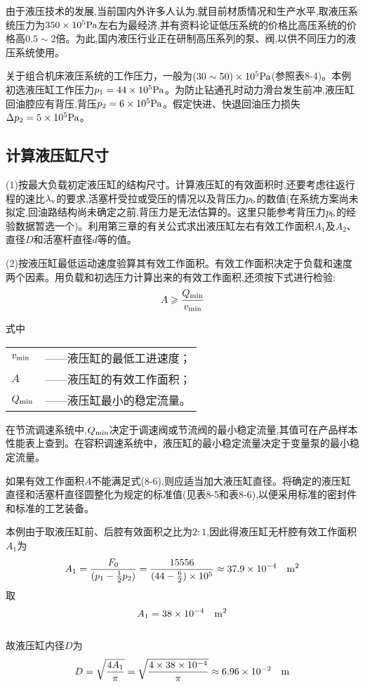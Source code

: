由于液压技术的发展,当前国内外许多人认为,就目前材质情况和生产水平,取液压系统压力为$350\times 10^5{\rm Pa}$左右为最经济,并有资料论证低压系统的价格比高压系统的价格高$0.5\sim 2$倍。为此,国内液压行业正在研制高压系列的泵、阀,以供不同压力的液压系统使用。

关于组合机床液压系统的工作压力，一般为$(30\sim 50)\times 10^5{\rm Pa}$(参照表8-4)。本例初选液压缸工作压力$p_{1}=44\times 10^5{\rm Pa}$。为防止钻通孔时动力滑台发生前冲,液压缸回油腔应有背压,背压$p_{2}=6\times 10^5{\rm Pa}$。假定快进、快退回油压力损失$\Delta p_{2}=5\times 10^5{\rm Pa}$。

\subsection{计算液压缸尺寸}
(1)按最大负载初定液压缸的结构尺寸。计算液压缸的有效面积时,还要考虑往返行程的速比$\lambda_{\rm v}$的要求,活塞杆受拉或受压的情况以及背压力$p_{\rm b}$的数值(在系统方案尚未拟定,回油路结构尚未确定之前,背压力是无法估算的。这里只能参考背压力$p_{\rm b}$的经验数据暂选一个)。利用第三章的有关公式求出液压缸左右有效工作面积$A_{1}$及$A_{2}$、直径$D$和活塞杆直径$d$等的值。

(2)按液压缸最低运动速度验算其有效工作面积。有效工作面积决定于负载和速度两个因素。用负载和初选压力计算出来的有效工作面积,还须按下式进行检验:
\begin{equation}
A\geqslant \frac{Q_{\rm min}}{v_{\rm min}}
\end{equation}

\noindent 式中\quad
\begin{tabular}[t]{ll}
$v_{\rm min}$ &——液压缸的最低工进速度；\\
$A$ &——液压缸的有效工作面积；\\
$Q_{\rm min}$ &——液压缸最小的稳定流量。
\end{tabular}

在节流调速系统中,$Q_{\rm min}$决定于调速阀或节流阀的最小稳定流量,其值可在产品样本性能表上查到。在容积调速系统中，液压缸的最小稳定流量决定于变量泵的最小稳定流量。

如果有效工作面积$A$不能满足式(8-6),则应适当加大液压缸直径。将确定的液压缸直径和活塞杆直径圆整化为规定的标准值(见表8-5和表8-6),以便采用标准的密封件和标准的工艺装备。

本例由于取液压缸前、后腔有效面积之比为$2:1$,因此得液压缸无杆腔有效工作面积$A_{1}$为
\begin{equation*}
A_{1}=\frac{F_0}{(p_1-\frac{1}{2}p_2)}=\frac{15556}{(44-\frac{6}{2})\times 10^5}\approx 37.9 \times 10^{-4}\quad\rm{m^2}
\end{equation*}
取$$A_1=38\times 10^{-4}\quad\rm{m^2}$$\\
故液压缸内径$D$为
\begin{equation*}
D=\sqrt {\frac{4A_1}{\pi}}=\sqrt{\frac{4\times 38\times 10^{-4}}{\pi}}\approx 6.96\times 10^{-2}\quad\rm{m}
\end{equation*}

